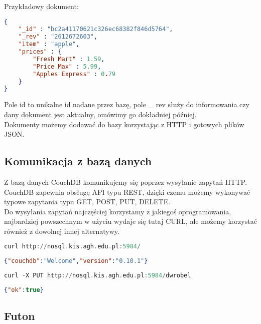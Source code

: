 \documentclass[a4paper,15pt]{article}
\begin{document}
Przykładowy dokument:

\begin{lstlisting}[language=json,firstnumber=1]
{
	"_id" : "bc2a41170621c326ec68382f846d5764",
	"_rev" : "2612672603",
	"item" : "apple",
	"prices" : {
		"Fresh Mart" : 1.59,
		"Price Max" : 5.99,
		"Apples Express" : 0.79
	}
}
\end{lstlisting}

Pole id to unikalne id nadane przez bazę, pole \_ rev służy do informowania czy dany dokument jest aktualny, omówimy go dokładniej później. \\

Dokumenty możemy dodawać do bazy korzystając z HTTP i gotowych plików JSON. 

\subsection{Komunikacja z bazą danych}

Z bazą danych CouchDB komunikujemy się poprzez wysyłanie zapytań HTTP. CouchDB zapewnia obsługę API typu REST, dzięki czemu możemy wykonywać typowe zapytania typu GET, POST, PUT, DELETE. \\

Do wysyłania zapytań najczęściej korzystamy z jakiegoś oprogramowania, najbardziej powszechnym w użyciu wydaje się tutaj CURL, ale możemy korzystać również z dowolnej innej alternatywy.

\begin{lstlisting}[language=Ada, caption=Testowanie czy CouchDB dziala]
curl http://nosql.kis.agh.edu.pl:5984/
\end{lstlisting}

\begin{lstlisting}[language=json,firstnumber=1]
{"couchdb":"Welcome","version":"0.10.1"}
\end{lstlisting}


\begin{lstlisting}[language=Ada, caption=Tworzenie nowej bazy o nazwie dwrobel]
curl -X PUT http://nosql.kis.agh.edu.pl:5984/dwrobel
\end{lstlisting}

\begin{lstlisting}[language=json,firstnumber=1]
{"ok":true}
\end{lstlisting}

\subsection{Futon}
\end{document}
